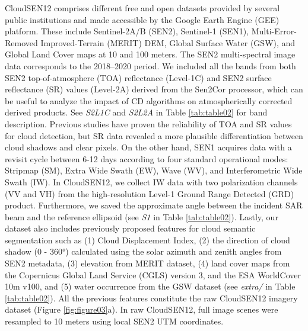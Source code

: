 \documentclass[a4paper, nobind]{templates/cdethesis}
\begin{document}
CloudSEN12 comprises different free and open datasets provided by several public institutions and made accessible by the Google Earth Engine (GEE) platform\cite{Gorelick2017}. These include Sentinel-2A/B (SEN2), Sentinel-1 (SEN1), Multi-Error-Removed Improved-Terrain (MERIT) DEM\cite{Yamazaki2019}, Global Surface Water\cite{Pekel2016} (GSW), and Global Land Cover maps\cite{Buchhorn2020} at 10 and 100 meters. The SEN2 multi-spectral image data corresponds to the 2018--2020 period. We included all the bands from both SEN2 top-of-atmosphere (TOA) reflectance (Level-1C) and SEN2 surface reflectance (SR) values (Level-2A) derived from the Sen2Cor processor, which can be useful to analyze the impact of CD algorithms on atmospherically corrected derived products. See \textit{S2L1C} and \textit{S2L2A} in Table \ref{tab:table02} for band description. Previous studies have proven the reliability of TOA\cite{Zekoll2021} and SR values for cloud detection, but SR data revealed a more plausible differentiation between cloud shadows and clear pixels\cite{Domnich2021}. On the other hand, SEN1 acquires data with a revisit cycle between 6-12 days according to four standard operational modes: Stripmap (SM), Extra Wide Swath (EW), Wave (WV), and Interferometric Wide Swath (IW). In CloudSEN12, we collect IW data with two polarization channels (VV and VH) from the high-resolution Level-1 Ground Range Detected (GRD) product. Furthermore, we saved the approximate angle between the incident SAR beam and the reference ellipsoid (see \textit{S1} in Table \ref{tab:table02}). Lastly, our dataset also includes previously proposed features for cloud semantic segmentation such as (1) Cloud Displacement Index\cite{Frantz2018}, (2) the direction of cloud shadow (0 - 360°) calculated using the solar azimuth and zenith angles\cite{FernandezMoranPHOTO21} from SEN2 metadata, (3) elevation from MERIT dataset, (4) land cover maps from the Copernicus Global Land Service (CGLS) version 3, and the ESA WorldCover 10m v100, and (5) water occurrence from the GSW dataset (see \textit{extra/} in Table \ref{tab:table02}). All the previous features constitute the raw CloudSEN12 imagery dataset (Figure \ref{fig:figure03}a). In raw CloudSEN12, full image scenes were resampled to 10 meters using local SEN2 UTM coordinates.
\end{document}
